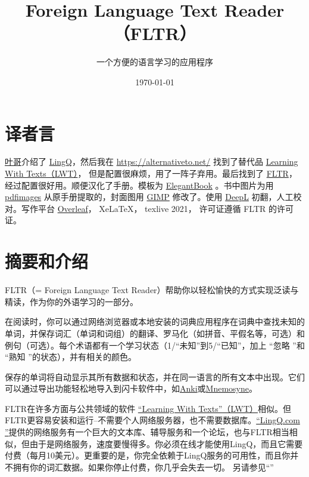 \documentclass[cn,10pt,math=newtx,citestyle=gb7714-2015,bibstyle=gb7714-2015]{elegantbook}
\title{Foreign Language Text Reader（FLTR）}
\subtitle{一个方便的语言学习的应用程序}
\date{\today{}}
\begin{document}
\maketitle
\frontmatter

\tableofcontents

\mainmatter
\setlength{\parskip}{2em}

\chapter*{译者言}

\href{https://www.zhihu.com/people/L.M.Sherlock}{叶哥}介绍了 \href{http://www.lingq.com/}{LingQ}，然后我在 \url{https://alternativeto.net/} 找到了替代品  \href{http://lwt.sourceforge.net/}{Learning With Texts（LWT）}， 但是配置很麻烦，用了一阵子弃用。最后找到了 \href{https://sourceforge.net/projects/foreign-language-text-reader/}{FLTR}， 经过配置很好用。顺便汉化了手册。模板为 \href{https://github.com/ElegantLaTeX/ElegantBook}{ElegantBook} 。书中图片为用 \href{https//man.archlinux.org/man/pdfimages.1.en}{pdfimages} 从原手册提取的，封面图用 \href{https://www.gimp.org/}{GIMP} 修改了。使用 \href{https://www.deepl.com/translator/files}{DeepL} 初翻，人工校对。写作平台 \href{https://www.overleaf.com/}{Overleaf}， XeLaTeX， texlive 2021， 许可证遵循 FLTR 的许可证。

\chapter{摘要和介绍}

FLTR（= Foreign Language Text Reader）帮助你以轻松愉快的方式实现泛读与精读，作为你的外语学习的一部分。


在阅读时，你可以通过网络浏览器或本地安装的词典应用程序在词典中查找未知的单词，并保存词汇（单词和词组）的翻译、罗马化（如拼音、平假名等，可选）和例句（可选）。每个术语都有一个学习状态（1/“未知”到5/“已知”，加上 “忽略 ”和 “熟知 ”的状态），并有相关的颜色。

保存的单词将自动显示其所有数据和状态，并在同一语言的所有文本中出现。它们可以通过导出功能轻松地导入到闪卡软件中，如\href{http://ankisrs.net/}{Anki}或\href{http://www.mnemosyne-proj.org/}{Mnemosyne}。


FLTR在许多方面与公共领域的软件 \href{http://lwt.sourceforge.net/}{“Learning With Texts”（LWT）}相似。但FLTR更容易安装和运行--不需要个人网络服务器，也不需要数据库。\href{http://www.lingq.com/}{“LingQ.com ”}提供的网络服务有一个巨大的文本库、辅导服务和一个论坛，也与FLTR相当相似，但由于是网络服务，速度要慢得多。你必须在线才能使用LingQ，而且它需要付费（每月10美元）。更重要的是，你完全依赖于LingQ服务的可用性，而且你并不拥有你的词汇数据。如果你停止付费，你几乎会失去一切。
另请参见“”
\end{document}
